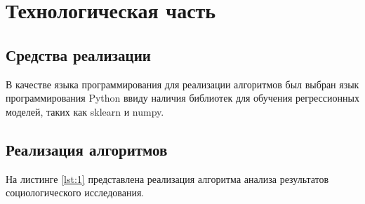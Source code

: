 \chapter{Технологическая часть}

\section{Средства реализации}

В качестве языка программирования для реализации алгоритмов был выбран язык программирования Python ввиду наличия библиотек для обучения регрессионных моделей, таких как sklearn и numpy.

\section{Реализация алгоритмов}

На листинге \ref{lst:1} представлена реализация алгоритма анализа результатов социологического исследования.


